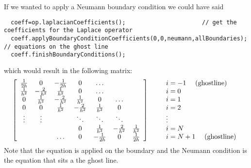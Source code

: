 If we wanted to apply a Neumann boundary condition we could have said
{\footnotesize
\begin{verbatim}
  coeff=op.laplacianCoefficients();                      // get the coefficients for the Laplace operator
  coeff.applyBoundaryConditionCoefficients(0,0,neumann,allBoundaries);   // equations on the ghost line
  coeff.finishBoundaryConditions();
\end{verbatim}
}
which would result in the following matrix:
\begin{equation*}
   \left[\begin{array}{ccccccc}
         {1\over 2h} & 0    &-{1\over 2h} &  0   &\ldots&      &    \\
         {1\over h^2} & -{2\over h^2} & {1\over h^2} & 0    &\ldots&      &   \\
         0    & {1\over h^2} & -{2\over h^2} & {1\over h^2} &  0   &\ldots&   \\
         0    &  0   & {1\over h^2} & -{2\over h^2} & {1\over h^2} &  0   &   \\
        \vdots&\vdots&      &\ddots&\ddots&\ddots&    \\
              &      &      &  0   & {1\over h^2} & -{2\over h^2} & {1\over h^2} \\
              &      &\ldots&  0   &-{1\over 2h} &   0  &{1\over 2h}  
    \end{array} \right]
  \qquad
   \begin{array}{l}
    i=-1~~~~{\rm (ghost line)}\\i=0\\i=1\\i=2\\ \vdots \\ i=N\\ i=N+1~~~~{\rm (ghost line)}
   \end{array}
\end{equation*}
Note that the equation is applied on the boundary and the Neumann condition is the equation that sits
a the ghost line.



